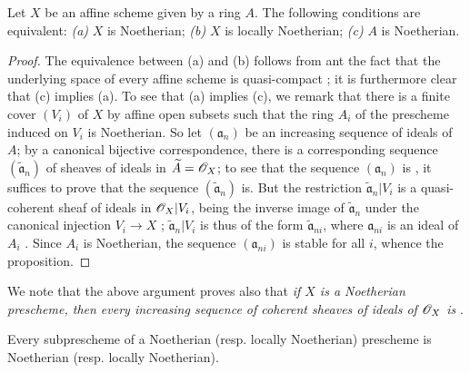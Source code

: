 \begin{proposition}[6.1.3]
\label{I.6.1.3}
Let $X$ be an affine scheme given by a ring $A$.
The following conditions are equivalent:
\emph{(a)} $X$ is Noetherian;
\emph{(b)} $X$ is locally Noetherian;
\emph{(c)} $A$ is Noetherian.
\end{proposition}

\begin{proof}
The equivalence between (a) and (b) follows from  ant the fact that the underlying space of every affine scheme is quasi-compact ; it is furthermore clear that (c) implies (a).
To see that (a) implies (c), we remark that there is a finite cover $(V_i)$ of $X$ by affine open subsets such that the ring $A_i$ of the prescheme induced on $V_i$ is Noetherian.
So let $(\mathfrak{a}_n)$ be an increasing sequence of ideals of $A$; by a canonical bijective correspondence, there is a corresponding sequence $(\widetilde{\mathfrak{a}}_n)$ of sheaves of ideals in $\widetilde{A}=\mathscr{O}_X$;
to see that the sequence $(\mathfrak{a}_n)$ is , it suffices to prove that the sequence $(\widetilde{\mathfrak{a}}_n)$ is.
But the restriction $\widetilde{\mathfrak{a}}_n|V_i$ is a quasi-coherent sheaf of ideals in $\mathscr{O}_X|V_i$, being the inverse image of $\widetilde{\mathfrak{a}}_n$ under the canonical injection $V_i\to X$ ;
$\widetilde{\mathfrak{a}}_n|V_i$ is thus of the form $\widetilde{\mathfrak{a}}_{ni}$, where $\mathfrak{a}_{ni}$ is an ideal of $A_i$ .
Since $A_i$ is Noetherian, the sequence $(\mathfrak{a}_{ni})$ is stable for all $i$, whence the proposition.
\end{proof}

We note that the above argument proves also that \emph{if $X$ is a Noetherian prescheme, then every increasing sequence of coherent sheaves of ideals of $\mathscr{O}_X$ is }.

\begin{proposition}[6.1.4]
\label{I.6.1.4}
Every subprescheme of a Noetherian (resp. locally Noetherian) prescheme is Noetherian (resp. locally Noetherian).
\end{proposition}

